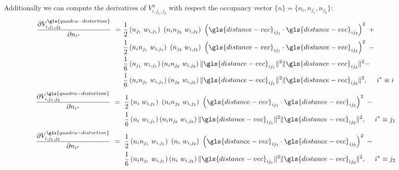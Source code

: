 \documentclass{article}
\begin{document}
Additionally we can compute the derivatives of $V^{\lambda}_{i,j_1,j_2}$ with respect the occupancy vector $\{n\} = \{n_i , n_{j_1} , n_{j_2}\}$:
\begin{equation}
    \begin{split}
        \frac{\partial V^{\gls{quadru-distortion}}_{i,j_1,j_2}}{\partial n_{i^*}}\ =\ &\frac{1}{2} \left(n_{j_1}\ w_{i,j_1}\right) \left(n_i n_{j_2}\ w_{i,j_2}\right)\ \left(\gls{distance-vec}_{ij_1} \cdot \gls{distance-vec}_{ij_2} \right)^2 + \\
        &\frac{1}{2} \left(n_i n_{j_1}\ w_{i,j_1}\right) \left(n_{j_2}\ w_{i,j_2}\right)\ \left(\gls{distance-vec}_{ij_1} \cdot \gls{distance-vec}_{ij_2} \right)^2 - \\
        &\frac{1}{6} \left(n_{j_1}\ w_{i,j_1}\right) \left(n_i n_{j_2}\ w_{i,j_2}\right) \| \gls{distance-vec}_{ij_1} \|^2 \| \gls{distance-vec}_{ij_2} \|^2 - \\
        &\frac{1}{6} \left(n_i n_{j_1}\ w_{i,j_1}\right) \left(n_{j_2}\ w_{i,j_2}\right) \| \gls{distance-vec}_{ij_1} \|^2 \| \gls{distance-vec}_{ij_2} \|^2,\ \quad i^{*} \equiv i
    \end{split}
\end{equation}
\begin{equation}
    \begin{split}
        \frac{\partial V^{\gls{quadru-distortion}}_{i,j_1,j_2}}{\partial n_{i^*}}\ =\ \frac{1}{2} &\left(n_i\ w_{i,j_1}\right) \left(n_i n_{j_2}\ w_{i,j_2}\right)\ \left(\gls{distance-vec}_{ij_1} \cdot \gls{distance-vec}_{ij_2} \right)^2 - \\
        \frac{1}{6} &\left(n_i\ w_{i,j_1}\right) \left(n_i n_{j_2}\ w_{i,j_2}\right) \| \gls{distance-vec}_{ij_1} \|^2 \| \gls{distance-vec}_{ij_2} \|^2,\ \quad i^{*} \equiv j_1
    \end{split}
\end{equation}
\begin{equation}
    \begin{split}
        \frac{\partial V^{\gls{quadru-distortion}}_{i,j_1,j_2}}{\partial n_{i^*}}\ =\ \frac{1}{2} &\left(n_i n_{j_1}\ w_{i,j_1}\right) \left(n_i\ w_{i,j_2}\right)\ \left(\gls{distance-vec}_{ij_1} \cdot \gls{distance-vec}_{ij_2} \right)^2 - \\
        \frac{1}{6} &\left(n_i n_{j_1}\ w_{i,j_1}\right) \left(n_i\ w_{i,j_2}\right) \| \gls{distance-vec}_{ij_1} \|^2 \| \gls{distance-vec}_{ij_2} \|^2,\ \quad i^{*} \equiv j_2
    \end{split}
\end{equation}
\end{document}
